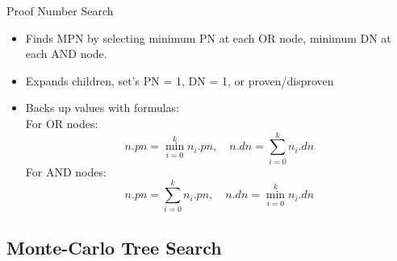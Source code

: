 \documentclass{beamer} %
\begin{document}
\begin{frame}{Proof Number Search}
\begin{itemize}
	\item Finds MPN by selecting minimum PN at each OR node, minimum DN at each AND node.
	\item Expands children, set's PN = 1, DN = 1, or proven/disproven
	\item Backs up values with formulas: \\
	For OR nodes: $$ n.pn = \displaystyle\min\limits_{i=0}^k n_i.pn,\quad n.dn = \displaystyle\sum\limits_{i=0}^k n_i.dn $$ For AND nodes: $$ n.pn = \displaystyle\sum\limits_{i=0}^k n_i.pn, \quad n.dn = \displaystyle\min\limits_{i=0}^k n_i.dn $$
\end{itemize}
\end{frame}




\subsection*{Monte-Carlo Tree Search}
\end{document}
